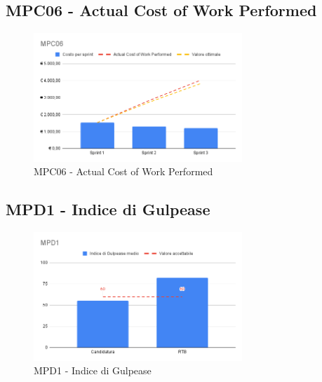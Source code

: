 \subsection{MPC06 - Actual Cost of Work Performed}
\label{s:mpc06}
\begin{figure}[htbp]
    \centering
    \includegraphics[width=0.7\textwidth]{img/MPC06.png}
    \caption{MPC06 - Actual Cost of Work Performed}
    \label{fig:mpc06}
\end{figure}

\newpage
\subsection{MPD1 - Indice di Gulpease}
\label{s:mpd1}
\begin{figure}[htbp]
    \centering
    \includegraphics[width=0.7\textwidth]{img/MPD1.png}
    \caption{MPD1 - Indice di Gulpease}
    \label{fig:mpd1}
\end{figure}